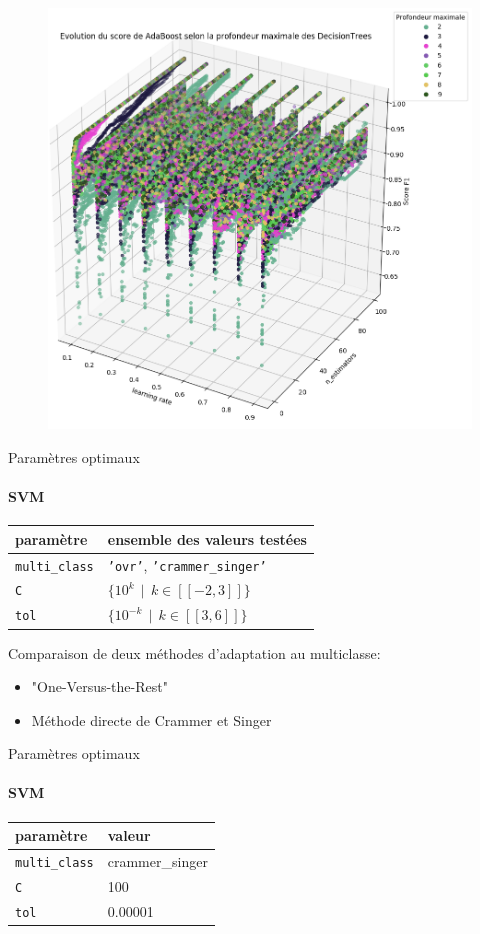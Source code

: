 \documentclass[usenames,dvipsnames]{beamer}
\begin{document}
\begin{frame}
\begin{figure}
\centering
\includegraphics[width=.7\textwidth]{img/adaboost_depth.png}
\end{figure}
\end{frame}


\begin{frame}{Paramètres optimaux}
\framesubtitle{SVM}

\begin{table}[h]
\centering
\begin{tabular}{ll}
paramètre & ensemble des valeurs testées \\
\hline
\texttt{multi\_class} & \texttt{'ovr'}, \texttt{'crammer\_singer'} \\
\texttt{C} & $\{10^k \>\> | \>\> k \in [\![-2, 3]\!] \}$ \\
\texttt{tol} & $\{10^{-k} \>\> | \>\> k \in [\![3, 6]\!] \}$ \\
\end{tabular}

\end{table}

\medskip
Comparaison de deux méthodes d'adaptation au multiclasse:
\begin{itemize}

\item "One-Versus-the-Rest"
\smallskip
\item Méthode directe de Crammer et Singer
\end{itemize}


\end{frame}

\begin{frame}{Paramètres optimaux}
\framesubtitle{SVM}

\begin{table}[h]
\centering
\begin{tabular}{ll}
paramètre & valeur \\
\hline
\texttt{multi\_class} & crammer\_singer \\
\texttt{C} & 100 \\
\texttt{tol} & 0.00001\\
\end{tabular}
\end{table}
\end{frame}
\end{document}
